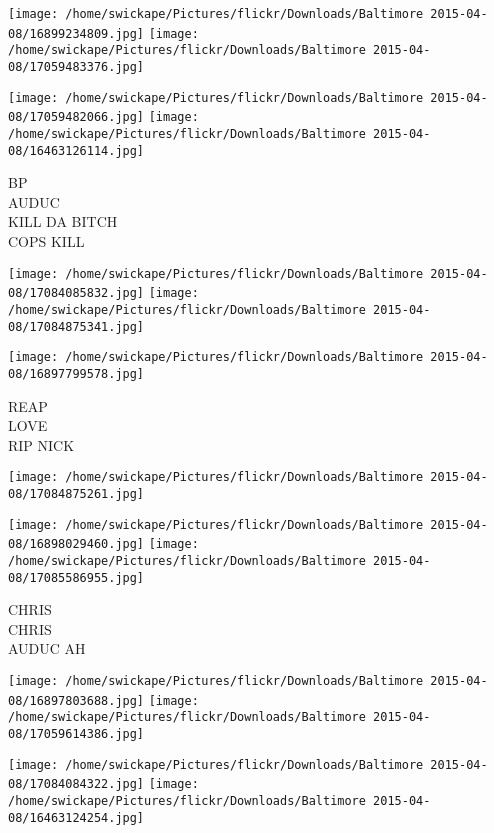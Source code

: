 \documentclass[10pt,letterpaper]{article}
\begin{document}
\texttt{[image: /home/swickape/Pictures/flickr/Downloads/Baltimore 2015-04-08/16899234809.jpg]}
\texttt{[image: /home/swickape/Pictures/flickr/Downloads/Baltimore 2015-04-08/17059483376.jpg]}

\texttt{[image: /home/swickape/Pictures/flickr/Downloads/Baltimore 2015-04-08/17059482066.jpg]}
\texttt{[image: /home/swickape/Pictures/flickr/Downloads/Baltimore 2015-04-08/16463126114.jpg]}

BP\\
AUDUC\\
KILL DA BITCH\\
COPS KILL\\
\pagebreak

\texttt{[image: /home/swickape/Pictures/flickr/Downloads/Baltimore 2015-04-08/17084085832.jpg]}
\texttt{[image: /home/swickape/Pictures/flickr/Downloads/Baltimore 2015-04-08/17084875341.jpg]}

\texttt{[image: /home/swickape/Pictures/flickr/Downloads/Baltimore 2015-04-08/16897799578.jpg]}

REAP\\
LOVE\\
RIP NICK\\
\pagebreak

\texttt{[image: /home/swickape/Pictures/flickr/Downloads/Baltimore 2015-04-08/17084875261.jpg]}

\vspace{0.25in}
\texttt{[image: /home/swickape/Pictures/flickr/Downloads/Baltimore 2015-04-08/16898029460.jpg]}
\texttt{[image: /home/swickape/Pictures/flickr/Downloads/Baltimore 2015-04-08/17085586955.jpg]}

CHRIS\\
CHRIS\\
AUDUC AH\\
\pagebreak

\texttt{[image: /home/swickape/Pictures/flickr/Downloads/Baltimore 2015-04-08/16897803688.jpg]}
\texttt{[image: /home/swickape/Pictures/flickr/Downloads/Baltimore 2015-04-08/17059614386.jpg]}

\texttt{[image: /home/swickape/Pictures/flickr/Downloads/Baltimore 2015-04-08/17084084322.jpg]}
\texttt{[image: /home/swickape/Pictures/flickr/Downloads/Baltimore 2015-04-08/16463124254.jpg]}
\end{document}
